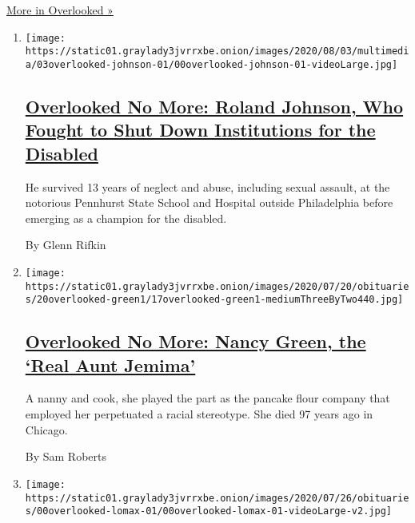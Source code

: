 \href{/spotlight/overlooked}{More in Overlooked »}

\begin{enumerate}
\def\labelenumi{\arabic{enumi}.}
\item
  \texttt{[image: https://static01.graylady3jvrrxbe.onion/images/2020/08/03/multimedia/03overlooked-johnson-01/00overlooked-johnson-01-videoLarge.jpg]}

  \hypertarget{overlooked-no-more-roland-johnson-who-fought-to-shut-down-institutions-for-the-disabled}{%
  \subsection{\texorpdfstring{\href{/2020/07/31/obituaries/roland-johnson-overlooked.html}{Overlooked
  No More: Roland Johnson, Who Fought to Shut Down Institutions for the
  Disabled}}{Overlooked No More: Roland Johnson, Who Fought to Shut Down Institutions for the Disabled}}\label{overlooked-no-more-roland-johnson-who-fought-to-shut-down-institutions-for-the-disabled}}

  He survived 13 years of neglect and abuse, including sexual assault,
  at the notorious Pennhurst State School and Hospital outside
  Philadelphia before emerging as a champion for the disabled.

  By Glenn Rifkin
\item
  \texttt{[image: https://static01.graylady3jvrrxbe.onion/images/2020/07/20/obituaries/20overlooked-green1/17overlooked-green1-mediumThreeByTwo440.jpg]}

  \hypertarget{overlooked-no-more-nancy-green-the-real-aunt-jemima}{%
  \subsection{\texorpdfstring{\href{/2020/07/17/obituaries/nancy-green-aunt-jemima-overlooked.html}{Overlooked
  No More: Nancy Green, the `Real Aunt
  Jemima'}}{Overlooked No More: Nancy Green, the `Real Aunt Jemima'}}\label{overlooked-no-more-nancy-green-the-real-aunt-jemima}}

  A nanny and cook, she played the part as the pancake flour company
  that employed her perpetuated a racial stereotype. She died 97 years
  ago in Chicago.

  By Sam Roberts
\item
  \texttt{[image: https://static01.graylady3jvrrxbe.onion/images/2020/07/26/obituaries/00overlooked-lomax-01/00overlooked-lomax-01-videoLarge-v2.jpg]}


\end{enumerate}
